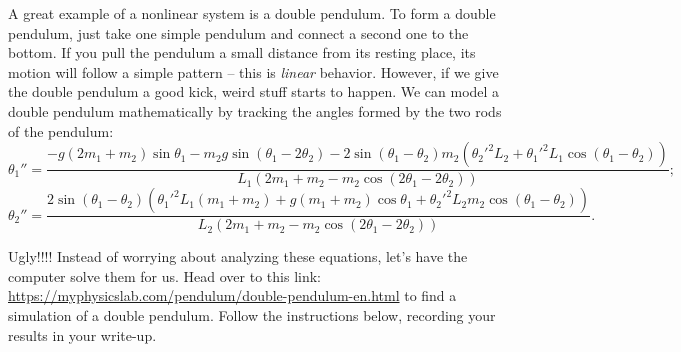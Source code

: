 \documentclass[11pt]{article}
\begin{document}
\medskip \noindent
A great example of a nonlinear system is a double pendulum. To form a double pendulum, just take one simple pendulum and connect a second one to the bottom. If you pull the pendulum a small distance from its resting place, its motion will follow a simple pattern -- this is \textit{linear} behavior. However, if we give the double pendulum a good kick, weird stuff starts to happen. We can model a double pendulum mathematically by tracking the angles formed by the two rods of the pendulum:
\begin{equation} \label{eq:theta1}
    \theta_1'' = \frac{-g(2m_1 + m_2)\sin\theta_1 - m_2 g \sin(\theta_1-2\theta_2) - 2\sin(\theta_1-\theta_2)m_2(\theta_2'^2 L_2 + \theta_1'^2 L_1 \cos(\theta_1-\theta_2))}{L_1 (2m_1 + m_2 - m_2\cos(2\theta_1-2\theta_2))};
\end{equation}
\begin{equation} \label{eq:theta2}
    \theta_2'' = \frac{2\sin(\theta_1-\theta_2)(\theta_1'^2 L_1(m_1 + m_2) + g(m_1 + m_2)\cos\theta_1 + \theta_2'^2 L_2 m_2 \cos(\theta_1-\theta_2))}{L_2(2m_1 + m_2 - m_2\cos(2\theta_1 - 2\theta_2))}.
\end{equation}

\medskip \noindent
Ugly!!!! Instead of worrying about analyzing these equations, let's have the computer solve them for us. Head over to this link: \url{https://myphysicslab.com/pendulum/double-pendulum-en.html} to find a simulation of a double pendulum. Follow the instructions below, recording your results in your write-up.
\end{document}
